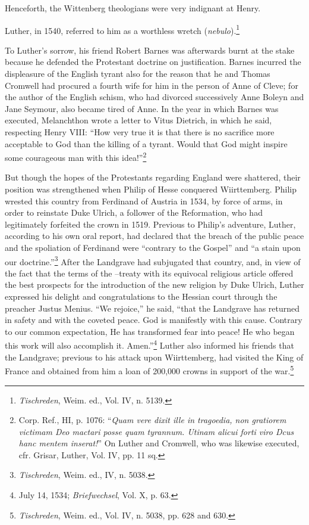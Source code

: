 Henceforth, the Wittenberg theologians were very indignant at
Henry.

Luther, in 1540, referred to him as a worthless wretch (\textit{nebulo}).\footnote{\textit{Tischreden}, Weim. ed., Vol. IV, n. 5139.}

To Luther’s sorrow, his friend Robert Barnes was afterwards burnt at the stake
because he defended the Protestant doctrine on justification. Barnes incurred
the displeasure of the English tyrant also for the reason that he and Thomas
Cromwell had procured a fourth wife for him in the person of Anne of
Cleve; for the author of the English schism, who had divorced successively
Anne Boleyn and Jane Seymour, also became tired of Anne. In the year in
which Barnes was executed, Melanchthon wrote a letter to Vitus Dietrich,
in which he said, respecting Henry VIII: “How very true it is that there is
no sacrifice more acceptable to God than the killing of a tyrant. Would
that God might inspire some courageous man with this idea!”\footnote
{Corp. Ref., HI, p. 1076: “\textit{Quam vere dixit ille in tragoedia, non gratiorem victimam
Deo mactari posse quam tyrannum. Utinam alicui forti viro Dcus hanc mentem inserat!}”
On Luther and Cromwell, who was likewise executed, cfr. Grisar, Luther, Vol. IV, pp.
11 sq.}

But though the hopes of the Protestants regarding England were
shattered, their position was strengthened when Philip of Hesse
conquered Wiirttemberg. Philip wrested this country from Ferdinand
of Austria in 1534, by force of arms, in order to reinstate Duke
Ulrich, a follower of the Reformation, who had legitimately forfeited
the crown in 1519. Previous to Philip’s adventure, Luther, according
to his own oral report, had declared that the breach of the public
peace and the spoliation of Ferdinand were “contrary to the Gospel”
and “a stain upon our doctrine.”\footnote{\textit{Tischreden}, Weim. ed., IV, n. 5038.}
 After the Landgrave had subjugated
that country, and, in view of the fact that the terms of the
--treaty with its equivocal religious article offered the best prospects
for the introduction of the new religion by Duke Ulrich, Luther
expressed his delight and congratulations to the Hessian court through
the preacher Justus Menius. “We rejoice,” he said, “that the Landgrave
has returned in safety and with the coveted peace. God is
manifestly with this cause. Contrary to our common expectation,
He has transformed fear into peace! He who began this work will
also accomplish it. Amen.”\footnote{July 14, 1534; \textit{Briefwechsel}, Vol. X, p. 63.}
 Luther also informed his friends that
the Landgrave; previous to his attack upon Wiirttemberg, had visited
the King of France and obtained from him a loan of 200,000 crowns
in support of the war.\footnote{\textit{Tischreden}, Weim. ed., Vol. IV, n. 5038, pp. 628 and 630.}


